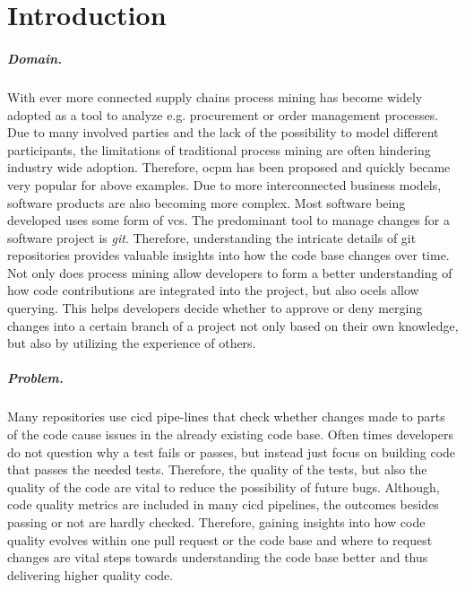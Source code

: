 \chapter{Introduction}
\label{chap:intro}

\paragraph{Domain.} With ever more connected supply chains process mining has become widely adopted as a tool to analyze e.g. procurement or order management processes. Due to many involved parties and the lack of the possibility to model different participants, the limitations of traditional process mining are often hindering industry wide adoption. Therefore, \ac{ocpm} has been proposed and quickly became very popular for above examples. Due to more interconnected business models,  software products are also becoming more complex. Most software being developed uses some form of \ac{vcs}. The predominant tool to manage changes for a software project is \emph{git}. Therefore, understanding the intricate details of git repositories provides valuable insights into how the code base changes over time. Not only does process mining allow developers to form a better understanding of how code contributions are integrated into the project, but also \acp{ocel}  allow querying. This helps developers decide whether to approve or deny merging changes into a certain branch of a project not only based on their own knowledge, but also by utilizing the experience of others. 
	
\paragraph{Problem.} Many repositories use \ac{cicd} pipe-lines that check whether changes made to parts of the code cause issues in the already existing code base. Often times developers do not question why a test fails or passes, but instead just focus on building code that passes the needed tests. Therefore, the quality of the tests, but also the quality of the code are vital to reduce the possibility of future bugs. Although, code quality metrics are included in many \ac{cicd} pipelines, the outcomes besides passing or not are hardly checked. Therefore, gaining insights into how code quality evolves within one pull request or the code base and where to request changes are vital steps towards understanding the code base better and thus delivering higher quality code.


